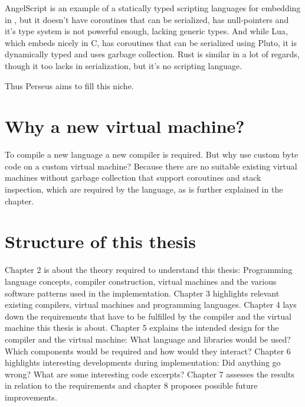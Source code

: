 	AngelScript\cite{angelscript} is an example of a statically typed scripting languages for embedding in {\CC}, but it doesn't have coroutines that can be serialized, has null-pointers and it's type system is not powerful enough, lacking generic types. And while Lua\cite{lua}, which embeds nicely in C, has coroutines that can be serialized using Pluto\cite{pluto}, it is dynamically typed and uses garbage collection. Rust\cite{rust} is similar in a lot of regards, though it too lacks in serialization, but it's no scripting language.
	
	Thus Perseus aims to fill this niche.
	
	\section{Why a new virtual machine?}
	
	To compile a new language a new compiler is required. But why use custom byte code on a custom virtual machine? Because there are no suitable existing virtual machines without garbage collection that support coroutines and stack inspection, which are required by the language, as is further explained in the  chapter.
	
	\section{Structure of this thesis}
	
	Chapter 2 is about the theory required to understand this thesis: Programming language concepts, compiler construction, virtual machines and the various software patterns used in the implementation. Chapter 3 highlights relevant existing compilers, virtual machines and programming languages. Chapter 4 lays down the requirements that have to be fulfilled by the compiler and the virtual machine this thesis is about. Chapter 5 explains the intended design for the compiler and the virtual machine: What language and libraries would be used? Which components would be required and how would they interact? Chapter 6 highlights interesting developments during implementation: Did anything go wrong? What are some interesting code excerpts? Chapter 7 assesses the results in relation to the requirements and chapter 8 proposes possible future improvements.
